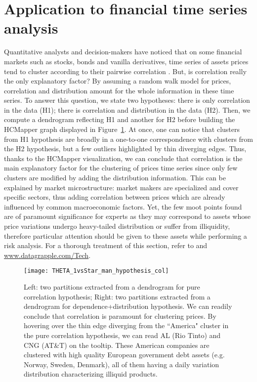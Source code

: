 \documentclass[10pt,conference,a4paper]{IEEEtran}
\begin{document}
\section{Application to financial time series analysis}

Quantitative analysts and decision-makers have noticed that on some financial markets such as stocks, bonds and vanilla derivatives, time series of assets prices tend to cluster according to their pairwise correlation \cite{tumminello2010correlation}. But, is correlation really the only explanatory factor? By assuming a random walk model for prices, correlation and distribution amount for the whole information \cite{sklar1959fonctions} in these time series. To answer this question, we state two hypotheses: there is only correlation in the data (H1); there is correlation and distribution in the data (H2). Then, we compute a dendrogram reflecting H1 and another for H2 before building the HCMapper graph displayed in Figure~\ref{fig:Theta1Star}. At once, one can notice that clusters from H1 hypothesis are broadly in a one-to-one correspondence with clusters from the H2 hypothesis, but a few outliers highlighted by thin diverging edges. Thus, thanks to the HCMapper visualization, we can conclude that correlation is the main explanatory factor for the clustering of prices time series since only few clusters are modified by adding the distribution information. This can be explained by market microstructure: market makers are specialized and cover specific sectors, thus adding correlation between prices  which are already influenced by common macroeconomic factors.
Yet, the few moot points found are of paramount significance for experts as they may correspond to assets whose price variations undergo heavy-tailed distribution or suffer from illiquidity, therefore particular attention should be given to these assets while performing a risk analysis. For a thorough treatment of this section, refer to \cite{donnat2016toward,marti2015proposal} and \url{www.datagrapple.com/Tech}.




\begin{figure}[htb]
	\texttt{[image: THETA\_1vsStar\_man\_hypothesis\_col]}
      \caption{\label{fig:Theta1Star}
            Left: two partitions extracted from a dendrogram for pure correlation hypothesis; Right: two partitions extracted from a dendrogram for dependence+distribution hypothesis. We can readily conclude that correlation is paramount for clustering prices. By hovering over the thin edge diverging from the ``America" cluster in the pure correlation hypothesis, we can read AL (Rio Tinto) and CNG (AT\&T) on the tooltip. These American companies are clustered with high quality European government debt assets (e.g. Norway, Sweden, Denmark), all of them having a daily variation distribution characterizing illiquid products.}
\end{figure}
\end{document}
